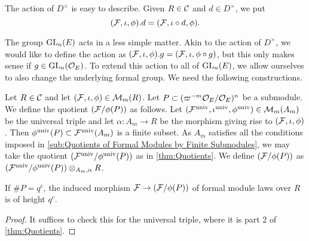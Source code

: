 \documentclass[../main.tex]{subfiles}
\begin{document}
The action of $D^\times$ is easy to describe. Given $R \in \mathcal{C}$ and 
$d \in D^\times$, we put
\begin{equation*}
  (\mathcal{F}, \iota, \phi).d = (\mathcal{F}, \iota \circ d, \phi).
\end{equation*}

The group $\operatorname{GL}_n(E)$ acts in a less simple matter. Akin to the action of
$D^\times$, we would like to define the action as
$(\mathcal{F}, \iota, \phi).g = (\mathcal{F}, \iota, \phi \circ g)$, but this only makes sense
if $g \in \operatorname{GL}_n(\mathcal{O}_E)$. To extend this action to all of $\operatorname{GL}_n(E)$, we
allow ourselves to also change the underlying formal group.
We need the following constructions.

\begin{defi}\label{def:QuotientModule}
  Let $R \in \mathcal{C}$ and let $(\mathcal{F}, \iota, \phi) \in \mathcal{M}_m(R)$. Let
  $P \subset (\varpi^{-m}\mathcal{O}_E/\mathcal{O}_E)^n$ be a submodule.
  We define the quotient $(\mathcal{F}/\phi(P))$ as follows. Let 
  $(\mathcal{F}^{\mathrm{univ}}, \iota^{\mathrm{univ}}, \phi^{{\mathrm{univ}}}) \in \mathcal{M}_m(A_m)$ be the universal 
  triple and let $\alpha\colon A_m \to R$ be the morphism giving rise to
  $(\mathcal{F}, \iota, \phi)$. Then $\phi^{\mathrm{univ}}(P) \subset \mathcal{F}^{\mathrm{univ}}(A_m)$ is a 
  finite subset. As $A_m$ satisfies all the conditions imposed in
  \cref{sub:Quotients of Formal Modules by Finite Submodules}, we may take the quotient
  $(\mathcal{F}^{\mathrm{univ}}/\phi^{\mathrm{univ}}(P))$ as in \cref{thm:Quotients}. We define
  $(\mathcal{F}/\phi(P))$ as $(\mathcal{F}^{\mathrm{univ}}/\phi^{\mathrm{univ}}(P))\otimes_{A_m,\alpha} R$. 
\end{defi}

\begin{lem}\label{lem:PropertyOfQuotient}
  If $\# P = q^c$, the induced morphism $\mathcal{F} \to (\mathcal{F}/\phi(P))$ of formal
  module laws over $R$ is of height $q^c$.
\begin{proof}
  It suffices to check this for the universal triple, where it is part 2 of 
  \cref{thm:Quotients}.
\end{proof}
\end{lem}
\end{document}
